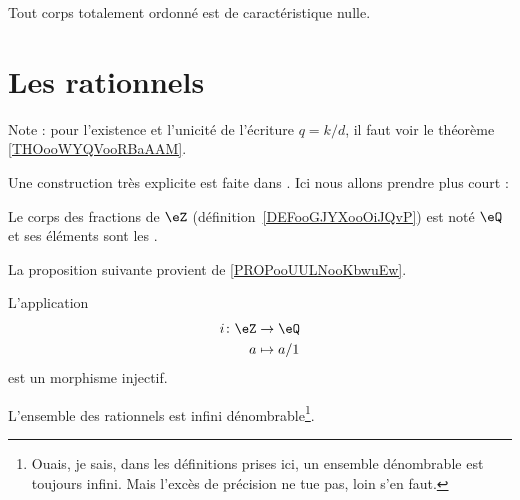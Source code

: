 \begin{lemma}       \label{LEMooVZNCooRJatKK}
	Tout corps totalement ordonné est de caractéristique nulle.
\end{lemma}

\section{Les rationnels}

Note : pour l'existence et l'unicité de l'écriture \( q=k/d\), il faut voir le théorème \ref{THOooWYQVooRBaAAM}.


Une construction très explicite est faite dans \cite{RWWJooJdjxEK}. Ici nous allons prendre plus court :
\begin{definition}
	Le corps des fractions de \( \eZ\) (définition~\ref{DEFooGJYXooOiJQvP}) est noté \( \eQ\) et ses éléments sont les .
\end{definition}


La proposition suivante provient de \ref{PROPooUULNooKbwuEw}.
\begin{proposition}	\label{PROPooKUIYooCxMHTX}
	L'application
	\begin{equation}
		\begin{aligned}
			i\colon \eZ & \to \eQ     \\
			a           & \mapsto a/1
		\end{aligned}
	\end{equation}
	est un morphisme injectif.
\end{proposition}




\begin{proposition}     \label{PROPooDHIAooZysvNs}
	L'ensemble des rationnels est infini dénombrable\footnote{Ouais, je sais, dans les définitions prises ici, un ensemble dénombrable est toujours infini. Mais l'excès de précision ne tue pas, loin s'en faut.}.
\end{proposition}


